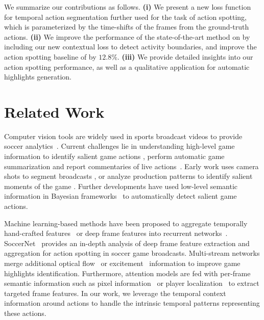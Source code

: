 \documentclass[10pt,twocolumn,letterpaper]{article}
\begin{document}
We summarize our contributions as follows. \textbf{(i)} We present a new loss function for temporal action segmentation further used for the task of action spotting, which is parameterized by the time-shifts of the frames from the ground-truth actions. \textbf{(ii)} We improve the performance of the state-of-the-art method on \ActivityNet by including our new contextual loss to detect activity boundaries, and improve the action spotting baseline of \SoccerNet by $12.8\%$. \textbf{(iii)} We provide detailed insights into our action spotting performance, as well as a qualitative application for automatic highlights generation.

 \section{Related Work}
\label{sec:SOTA}


Computer vision tools are widely used in sports broadcast videos to provide soccer analytics~\cite{moeslund2014computer,thomas2017computer}. Current challenges lie in understanding high-level game information to identify salient game actions \cite{Cioppa_2018_CVPR_Workshops,Tsunoda_2017_CVPR_Workshops}, perform automatic game summarization \cite{sanabria2019deep,Shukla_2018_CVPR_Workshops,turchini2019flexible} and report commentaries of live actions~\cite{Yu_2018_CVPR}. Early work uses camera shots to segment broadcasts \cite{ekin2003automatic}, or analyze production patterns to identify salient moments of the game \cite{ren2005football}. Further developments have used low-level semantic information in Bayesian frameworks~\cite{huang2006semantic,tavassolipour2014event} to automatically detect salient game actions.


Machine learning-based methods have been proposed to aggregate temporally hand-crafted features~\cite{baccouche2010action} or deep frame features \cite{jiang2016automatic} into recurrent networks~\cite{ramanathan2016detecting}. SoccerNet~\cite{Giancola_2018_CVPR_Workshops} provides an in-depth analysis of deep frame feature extraction and aggregation for action spotting in soccer game broadcasts. Multi-stream networks merge additional optical flow~\cite{Cai_2019_CVPR_Workshops,tsagkatakis2017goal} or excitement~\cite{bettadapura2016leveraging,Shukla_2018_CVPR_Workshops} information to improve game highlights identification. Furthermore, attention models are fed with per-frame semantic information such as pixel information~\cite{Cioppa_2018_CVPR_Workshops} or player localization~\cite{khan2018soccer} to extract targeted frame features. In our work, we leverage the temporal context information around actions to handle the intrinsic temporal patterns  representing these actions.
\end{document}
